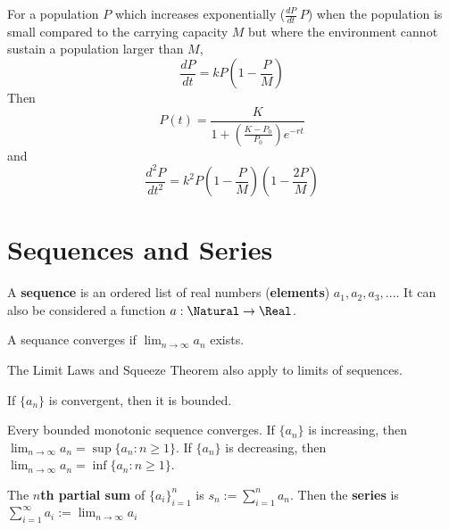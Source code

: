 \begin{definition} For a population $P$ which increases exponentially ($\frac{dP}{dt} ~ P$) when the population is small compared to the carrying capacity $M$ but where the environment cannot sustain a population larger than $M$,
  \[
    \frac{dP}{dt} = kP \left(1 - \frac{P}{M}\right)
  \]
  Then
  \[
    P(t) = \frac{K}{1 + \left(\frac{K - P_0}{P_0}\right) e^{-rt}}
  \]
  and
  \[
    \frac{d^2P}{dt^2} = k^2P \left(1 - \frac{P}{M}\right) \left(1 - \frac{2P}{M}\right)
  \]
\end{definition}

\section{Sequences and Series}

\begin{definition}[Sequence] A \textbf{sequence} is an ordered list of real numbers (\textbf{elements}) $a_1, a_2, a_3, ...$. It can also be considered a function $a: \Natural \rightarrow \Real$.
\end{definition}

\begin{definition}[Convergence] A sequance converges if $\lim_{n \to \infty} a_n$ exists.
\end{definition}

\begin{theorem} The Limit Laws and Squeeze Theorem also apply to limits of sequences.
\end{theorem}

\begin{theorem} If $\{ a_n \}$ is convergent, then it is bounded.
\end{theorem}

\begin{theorem} Every bounded monotonic sequence converges. If $\{ a_n \}$ is increasing, then $\displaystyle\lim_{n \to \infty} a_n = \sup \{ a_n : n \geq 1 \}$. If $\{ a_n \}$ is decreasing, then $\displaystyle\lim_{n \to \infty} a_n = \inf \{ a_n : n \geq 1 \}$.
\end{theorem}

\begin{definition}[Series] The \textbf{$n$th partial sum} of $\{ a_i \}_{i=1}^n$ is $s_n := \sum_{i = 1}^n a_n$. Then the \textbf{series} is $\sum_{i = 1}^\infty a_i := \lim_{n \to \infty} a_i$
\end{definition}

